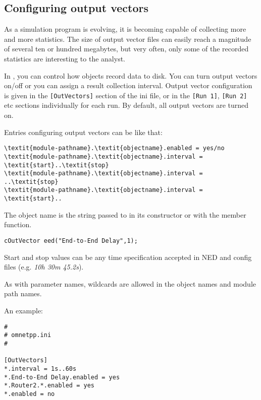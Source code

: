 \subsection{Configuring output vectors}

As a simulation program is evolving, it is becoming capable of
collecting more and more statistics. The size of output vector
files can easily reach a magnitude of
several ten or hundred megabytes, but very often, only some of the
recorded statistics are interesting to the analyst.


In {\opp}, you can control how  objects record data
to disk. You can turn output vectors on/off or you can assign a result
collection interval. Output vector configuration is given in the
\texttt{[OutVectors]} section of the ini file, or in the \texttt{[Run
  1]}, \texttt{[Run 2]} etc sections individually for each run. By
default, all output vectors are turned on.


Entries configuring output vectors can be like that:

\begin{Verbatim}[commandchars=\\\{\}]
\textit{module-pathname}.\textit{objectname}.enabled = yes/no
\textit{module-pathname}.\textit{objectname}.interval = \textit{start}..\textit{stop}
\textit{module-pathname}.\textit{objectname}.interval = ..\textit{stop}
\textit{module-pathname}.\textit{objectname}.interval = \textit{start}..
\end{Verbatim}

The object name is the string passed to  in its constructor 
or with the  member function.

\begin{Verbatim}
cOutVector eed("End-to-End Delay",1);
\end{Verbatim}

Start and stop values can be any time specification accepted 
in NED and config files (e.g. \textit{10h 30m 45.2s}). 


As with parameter names, wildcards are allowed in the object 
names and module path names.

An example:

\begin{Verbatim}
#
# omnetpp.ini
#

[OutVectors]
*.interval = 1s..60s
*.End-to-End Delay.enabled = yes
*.Router2.*.enabled = yes
*.enabled = no
\end{Verbatim}


